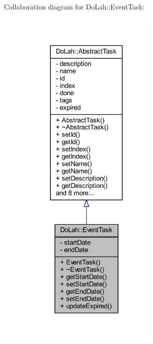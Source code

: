 Collaboration diagram for Do\+Lah\+:\+:Event\+Task\+:\nopagebreak
\begin{figure}[H]
\begin{center}
\leavevmode
\includegraphics[width=188pt]{class_do_lah_1_1_event_task__coll__graph}
\end{center}
\end{figure}
